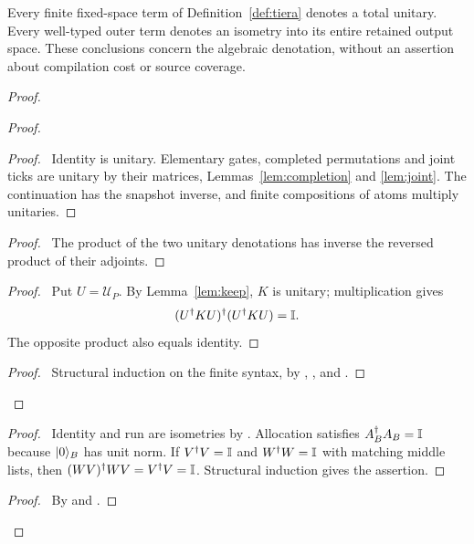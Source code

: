 \begin{lemma}\label{lem:term-types}
Every finite fixed-space term of Definition~\ref{def:tiera} denotes a
total unitary. Every well-typed outer term denotes an isometry into its
entire retained output space. These conclusions concern the algebraic
denotation, without an assertion about compilation cost or source coverage.
\end{lemma}
\begin{proof}
 \begin{proof}
  \begin{proof}\pf\ Identity is unitary. Elementary gates, completed
  permutations and joint ticks are unitary by their matrices,
  Lemmas~\ref{lem:completion} and \ref{lem:joint}. The continuation
  has the snapshot inverse, and finite compositions of atoms multiply
  unitaries.\end{proof}
  \begin{proof}\pf\ The product of the two unitary denotations has
  inverse the reversed product of their adjoints.\end{proof}
  \begin{proof}\pf\ Put $U=\mathcal U_P$. By
  Lemma~\ref{lem:keep}, $K$ is unitary; multiplication gives
  \[
   (U^\dagger KU)^\dagger(U^\dagger KU)=\mathbb{I}.
  \]
  The opposite product also equals identity.\end{proof}
  \qedstep
  \begin{proof}\pf\ Structural induction on the finite syntax, by
  , , and
  .\end{proof}
 \end{proof}
 \begin{proof}\pf\ Identity and run are isometries by
 . Allocation satisfies $A_B^\dagger A_B=\mathbb{I}$
 because $\lvert 0\rangle_B$ has unit norm. If $V^\dagger V=\mathbb{I}$ and
 $W^\dagger W=\mathbb{I}$ with matching middle lists, then
 $(WV)^\dagger WV=V^\dagger V=\mathbb{I}$. Structural induction gives
 the assertion.\end{proof}
 \qedstep
 \begin{proof}\pf\ By  and
 .\end{proof}
\end{proof}

